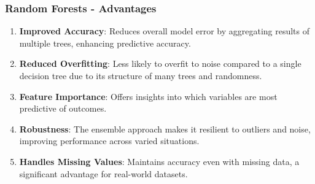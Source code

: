 \documentclass[aspectratio=169]{beamer}
\begin{document}
\begin{frame}[fragile]
    \frametitle{Random Forests - Advantages}
    \begin{enumerate}
        \item \textbf{Improved Accuracy}: Reduces overall model error by aggregating results of multiple trees, enhancing predictive accuracy.
        \item \textbf{Reduced Overfitting}: Less likely to overfit to noise compared to a single decision tree due to its structure of many trees and randomness.
        \item \textbf{Feature Importance}: Offers insights into which variables are most predictive of outcomes.
        \item \textbf{Robustness}: The ensemble approach makes it resilient to outliers and noise, improving performance across varied situations.
        \item \textbf{Handles Missing Values}: Maintains accuracy even with missing data, a significant advantage for real-world datasets.
    \end{enumerate}
\end{frame}
\end{document}
